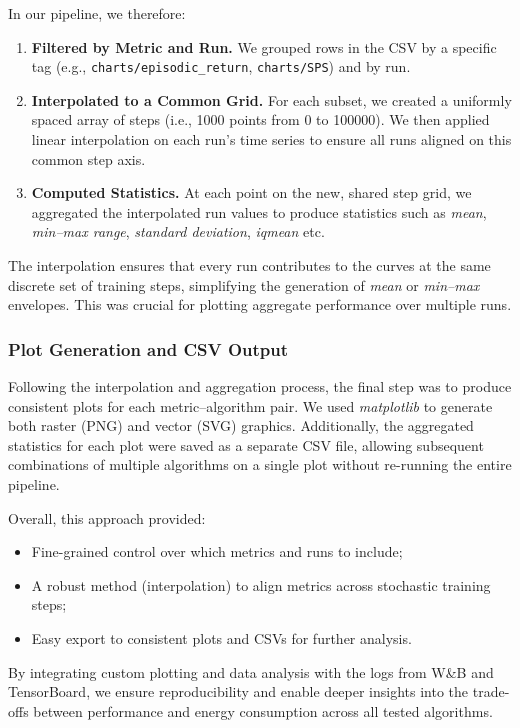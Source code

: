 In our pipeline, we therefore:
\begin{enumerate}
	\item \textbf{Filtered by Metric and Run.} We grouped rows in the CSV by a specific tag (e.g., \texttt{charts/episodic\_return}, \texttt{charts/SPS}) and by run.
	\item \textbf{Interpolated to a Common Grid.} For each subset, we created a uniformly spaced array of steps (i.e., \num{1000} points from \num{0} to \num{100000}). We then applied linear interpolation on each run's time series to ensure all runs aligned on this common step axis.
	\item \textbf{Computed Statistics.} At each point on the new, shared step grid, we aggregated the interpolated run values to produce statistics such as \textit{mean}, \textit{min--max range}, \textit{standard deviation}, \textit{iqmean} etc.
\end{enumerate}
The interpolation ensures that every run contributes to the curves at the same discrete set of training steps, simplifying the generation of \emph{mean} or \emph{min--max} envelopes. This was crucial for plotting aggregate performance over multiple runs.

\subsubsection{Plot Generation and CSV Output}
Following the interpolation and aggregation process, the final step was to produce consistent plots for each metric--algorithm pair. We used \emph{matplotlib} to generate both raster (PNG) and vector (SVG) graphics. Additionally, the aggregated statistics for each plot were saved as a separate CSV file, allowing subsequent combinations of multiple algorithms on a single plot without re-running the entire pipeline.

Overall, this approach provided:
\begin{itemize}
	\item Fine-grained control over which metrics and runs to include;
	\item A robust method (interpolation) to align metrics across stochastic training steps;
	\item Easy export to consistent plots and CSVs for further analysis.
\end{itemize}
By integrating custom plotting and data analysis with the logs from W\&B and TensorBoard, we ensure reproducibility and enable deeper insights into the trade-offs between performance and energy consumption across all tested algorithms.
